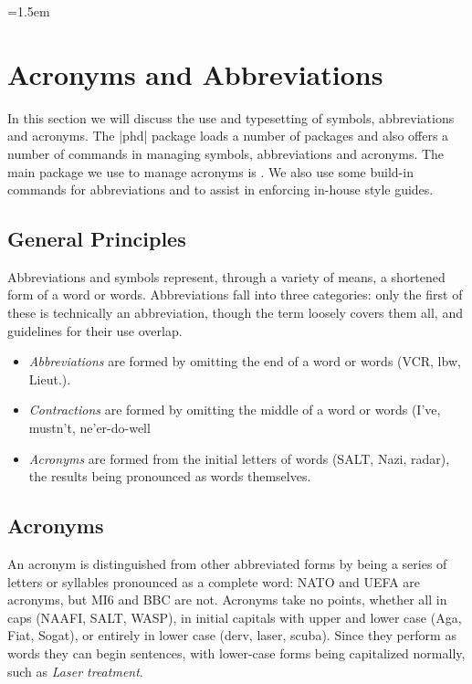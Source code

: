 \parindent=1.5em



\chapter{Acronyms and Abbreviations}


In this section we will discuss the use and typesetting of symbols, abbreviations and acronyms. The |phd| package loads a number of packages and also offers a number of commands in managing symbols, abbreviations and acronyms. The main package we use to manage acronyms is  \cite{acronym}. We also use some build-in commands for abbreviations and to assist in enforcing in-house style guides.  

\section{General Principles}

Abbreviations and symbols represent, through a variety of means, a
shortened form of a word or words. Abbreviations fall into three categories:
only the first of these is technically an abbreviation, though the
term loosely covers them all, and guidelines for their use overlap.

\begin{itemize}
\item \textit{Abbreviations} are formed by omitting the end of a word or words (VCR, lbw, Lieut.).
\item \textit{Contractions} are formed by omitting the middle of a word or words (I've,
mustn't, ne'er-do-well
\item \textit{Acronyms} are formed from the initial letters of words (SALT, Nazi, radar), the results being pronounced as words themselves.
\end{itemize}


\section{Acronyms}

An acronym is distinguished from other abbreviated forms by being a series of letters or 
syllables pronounced as a complete word: \textsc{NATO}
and UEFA are acronyms, but MI6 and BBC are not. Acronyms take no
points, whether all in caps (NAAFI, SALT, WASP), in initial capitals with
upper and lower case (Aga, Fiat, Sogat), or entirely in lower case (derv,
laser, scuba). Since they perform as words they can begin sentences, with
lower-case forms being capitalized normally, such as \textit{Laser treatment}. 

